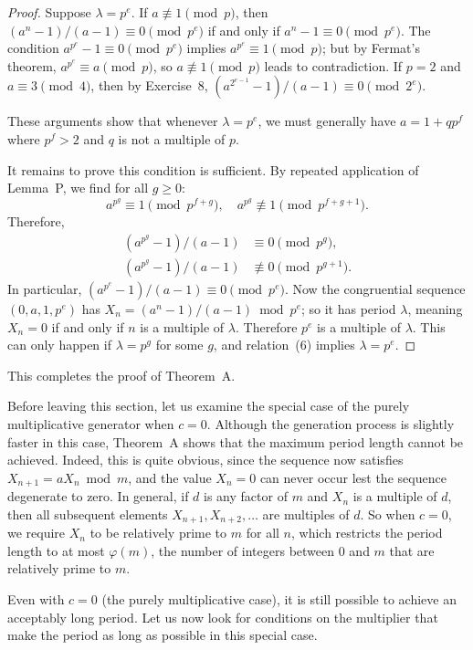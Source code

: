 \documentclass[12pt]{article}
\begin{document}
\begin{proof}
Suppose $\lambda = p^e$. If $a \not\equiv 1 \pmod{p}$, then $(a^n - 1)/(a-1) \equiv 0 \pmod{p^e}$ if and only if $a^n - 1 \equiv 0 \pmod{p^e}$. The condition $a^{p^e} - 1 \equiv 0 \pmod{p^e}$ implies $a^{p^e} \equiv 1 \pmod{p}$; but by Fermat's theorem, $a^{p^e} \equiv a \pmod{p}$, so $a \not\equiv 1 \pmod{p}$ leads to contradiction. If $p = 2$ and $a \equiv 3 \pmod{4}$, then by Exercise~8, $(a^{2^{e-1}} - 1)/(a-1) \equiv 0 \pmod{2^e}$.

These arguments show that whenever $\lambda = p^e$, we must generally have $a = 1 + qp^f$ where $p^f > 2$ and $q$ is not a multiple of $p$.

It remains to prove this condition is sufficient. By repeated application of Lemma~P, we find for all $g \geq 0$:
\[
a^{p^g} \equiv 1 \pmod{p^{f+g}}, \quad a^{p^g} \not\equiv 1 \pmod{p^{f+g+1}}.
\]
Therefore,
\begin{align}
(a^{p^g} - 1)/(a-1) &\equiv 0 \pmod{p^g}, \tag{6} \\
(a^{p^g} - 1)/(a-1) &\not\equiv 0 \pmod{p^{g+1}}.
\end{align}
In particular, $(a^{p^e} - 1)/(a-1) \equiv 0 \pmod{p^e}$. Now the congruential sequence $(0, a, 1, p^e)$ has $X_n = (a^n - 1)/(a-1) \bmod p^e$; so it has period $\lambda$, meaning $X_n = 0$ if and only if $n$ is a multiple of $\lambda$. Therefore $p^e$ is a multiple of $\lambda$. This can only happen if $\lambda = p^g$ for some $g$, and relation~(6) implies $\lambda = p^e$.
\end{proof}

This completes the proof of Theorem~A.

\bigskip

Before leaving this section, let us examine the special case of the purely multiplicative generator when $c = 0$. Although the generation process is slightly faster in this case, Theorem~A shows that the maximum period length cannot be achieved. Indeed, this is quite obvious, since the sequence now satisfies $X_{n+1} = aX_n \bmod m$, and the value $X_n = 0$ can never occur lest the sequence degenerate to zero. In general, if $d$ is any factor of $m$ and $X_n$ is a multiple of $d$, then all subsequent elements $X_{n+1}, X_{n+2}, \ldots$ are multiples of $d$. So when $c = 0$, we require $X_n$ to be relatively prime to $m$ for all $n$, which restricts the period length to at most $\varphi(m)$, the number of integers between 0 and $m$ that are relatively prime to $m$.

Even with $c = 0$ (the purely multiplicative case), it is still possible to achieve an acceptably long period. Let us now look for conditions on the multiplier that make the period as long as possible in this special case.
\end{document}
